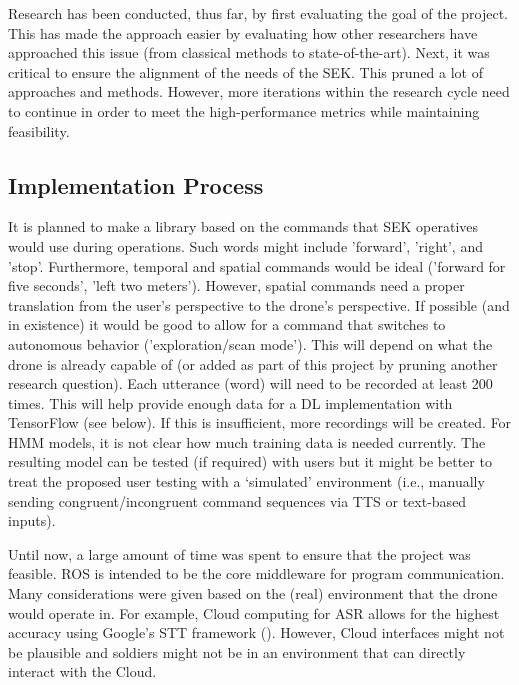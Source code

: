 Research has been conducted, thus far, by first evaluating the goal of the project. This has made the approach easier by evaluating how other researchers have approached this issue (from classical methods to state-of-the-art). Next, it was critical to ensure the alignment of the needs of the SEK. This pruned a lot of approaches and methods. However, more iterations within the research cycle need to continue in order to meet the high-performance metrics while maintaining feasibility. 


\subsection{Implementation Process}


It is planned to make a library based on the commands that SEK operatives would use during operations. Such words might include 'forward', 'right', and 'stop'. Furthermore, temporal and spatial commands would be ideal ('forward for five seconds', 'left two meters'). However, spatial commands need a proper translation from the user's perspective to the drone's perspective. If possible (and in existence) it would be good to allow for a command that switches to autonomous behavior ('exploration/scan mode'). This will depend on what the drone is already capable of (or added as part of this project by pruning another research question). Each utterance (word) will need to be recorded at least 200 times. This will help provide enough data for a DL implementation with TensorFlow (see below). If this is insufficient, more recordings will be created. For HMM models, it is not clear how much training data is needed currently. The resulting model can be tested (if required) with users but it might be better to treat the proposed user testing with a `simulated' environment (i.e., manually sending congruent/incongruent command sequences via TTS or text-based inputs). 
\smallskip


Until now, a large amount of time was spent to ensure that the project was feasible. ROS is intended to be the core middleware for program communication. Many considerations were given based on the (real) environment that the drone would operate in. For example, Cloud computing for ASR allows for the highest accuracy using Google's STT framework (\cite{Google}). However, Cloud interfaces might not be plausible and soldiers might not be in an environment that can directly interact with the Cloud.
\smallskip

